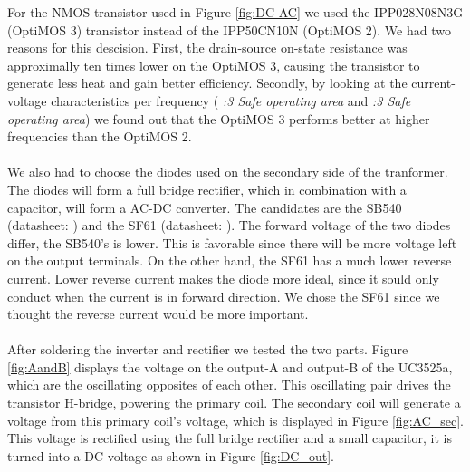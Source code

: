 \documentclass[final]{scrreprt} %
\begin{document}
For the NMOS transistor used in Figure \ref{fig:DC-AC} we used the IPP028N08N3G (OptiMOS 3) transistor instead of the IPP50CN10N (OptiMOS 2).
We had two reasons for this descision.
First, the drain-source on-state resistance was approximally ten times lower on the OptiMOS 3, causing the transistor to generate less heat and gain better efficiency.
Secondly, by looking at the current-voltage characteristics per frequency (\cite{OptiMOS2} \emph{:3 Safe operating area} and \cite{OptiMOS3} \emph{:3 Safe operating area}) we found out that the OptiMOS 3 performs better at higher frequencies than the OptiMOS 2.
\\ \\
We also had to choose the diodes used on the secondary side of the tranformer. The diodes will form a full bridge rectifier, which in combination with a capacitor, will form a AC-DC converter.
The candidates are the SB540 (datasheet: \cite{SB540}) and the SF61 (datasheet: \cite{SF61}).
The forward voltage of the two diodes differ, the SB540's is lower. This is favorable since there will be more voltage left on the output terminals.
On the other hand, the SF61 has a much lower reverse current. Lower reverse current makes the diode more ideal, since it sould only conduct when the current is in forward direction.
We chose the SF61 since we thought the reverse current would be more important.
\\ \\
After soldering the inverter and rectifier we tested the two parts.
Figure \ref{fig:AandB} displays the voltage on the output-A and output-B of the UC3525a, which are the oscillating opposites of each other.
This oscillating pair drives the transistor H-bridge, powering the primary coil.
The secondary coil will generate a voltage from this primary coil's voltage, which is displayed in Figure \ref{fig:AC_sec}.
This voltage is rectified using the full bridge rectifier and a small capacitor, it is turned into a DC-voltage as shown in Figure \ref{fig:DC_out}.
\end{document}
